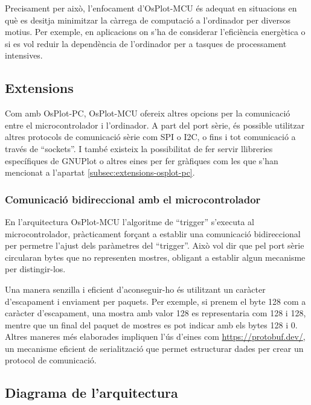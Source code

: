 \documentclass{tfgitic}[2023/06/30]
\begin{document}
Precisament per això, l'enfocament d'OsPlot-MCU és adequat en
situacions en què es desitja minimitzar la càrrega de computació a
l'ordinador per diversos motius. Per exemple, en aplicacions on s'ha
de considerar l'eficiència energètica o si es vol reduir la
dependència de l'ordinador per a tasques de processament intensives.

\subsection{Extensions}

Com amb OsPlot-PC, OsPlot-MCU ofereix altres opcions per la
comunicació entre el microcontrolador i l'ordinador. A part del port
sèrie, és possible utilitzar altres protocols de comunicació sèrie com
SPI o I2C, o fins i tot comunicació a través de ``sockets''. I també
existeix la possibilitat de fer servir llibreries específiques de
GNUPlot o altres eines per fer gràfiques com les que s'han mencionat a
l'apartat \ref{subsec:extensions-osplot-pc}.

\subsubsection{Comunicació bidireccional amb el microcontrolador}

En l'arquitectura OsPlot-MCU l'algoritme de ``trigger'' s'executa al
microcontrolador, pràcticament forçant a establir una comunicació
bidireccional per permetre l'ajust dels paràmetres del ``trigger''.
Això vol dir que pel port sèrie circularan bytes que no representen
mostres, obligant a establir algun mecanisme per distingir-los.

Una manera senzilla i eficient d'aconseguir-ho és utilitzant un
caràcter d'escapament i enviament per paquets. Per exemple, si prenem
el byte 128 com a caràcter d'escapament, una mostra amb valor 128 es
representaria com 128 i 128, mentre que un final del paquet de mostres
es pot indicar amb els bytes 128 i 0. Altres maneres més elaborades
impliquen l'ús d'eines com \href{Protobuf}{https://protobuf.dev/}, un
mecanisme eficient de serialització que permet estructurar dades per
crear un protocol de comunicació.

\subsection{Diagrama de l'arquitectura}

\printbibliography
\end{document}
